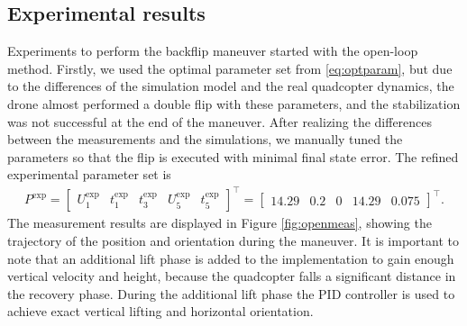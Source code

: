 \newpage
\subsection{Experimental results}

Experiments to perform the backflip maneuver started with the open-loop method. Firstly, we used the optimal parameter set from \eqref{eq:optparam}, but due to the differences of the simulation model and the real quadcopter dynamics, the drone almost performed a double flip with these parameters, and the stabilization was not successful at the end of the maneuver. After realizing the differences between the measurements and the simulations, we manually tuned the parameters so that the flip is executed with minimal final state error. The refined experimental parameter set is
\begin{align*}
    P^\mathrm{exp} = \begin{bmatrix}
U_1^\mathrm{exp} & t_1^\mathrm{exp} & t_3^\mathrm{exp} & U_5^\mathrm{exp}& t_5^\mathrm{exp}
\end{bmatrix} ^\top =  \begin{bmatrix}
14.29 & 0.2 & 0 & 14.29 & 0.075
\end{bmatrix}^\top.
\end{align*}
The measurement results are displayed in Figure \ref{fig:openmeas}, showing the trajectory of the position and orientation during the maneuver. It is important to note that an additional lift phase is added to the implementation to gain enough vertical velocity and height, because the quadcopter falls a significant distance in the recovery phase. During the additional lift phase the PID controller is used to achieve exact vertical lifting and horizontal orientation.

